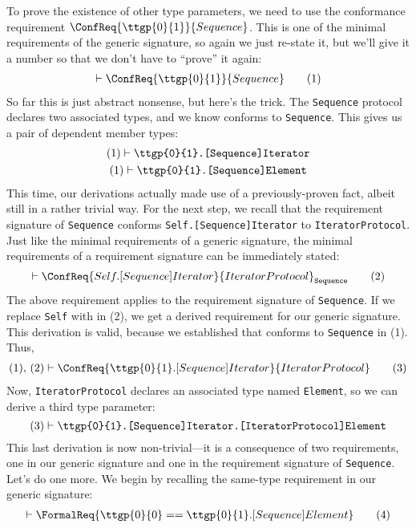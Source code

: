\documentclass[../generics]{subfiles}
\begin{document}
To prove the existence of other type parameters, we need to use the conformance requirement $\ConfReq{\ttgp{0}{1}}{Sequence}$. This is one of the minimal requirements of the generic signature, so again we just re-state it, but we'll give it a number so that we don't have to ``prove'' it again:
\begin{gather}
\vdash\ConfReq{\ttgp{0}{1}}{Sequence}\tag{1}
\end{gather}
So far this is just abstract nonsense, but here's the trick. The \texttt{Sequence} protocol declares two associated types, and we know  conforms to \texttt{Sequence}. This gives us a pair of dependent member types:
\begin{gather*}
(1)\vdash\texttt{\ttgp{0}{1}.[Sequence]Iterator}\\
(1)\vdash\texttt{\ttgp{0}{1}.[Sequence]Element}
\end{gather*}
This time, our derivations actually made use of a previously-proven fact, albeit still in a rather trivial way. For the next step, we recall that the requirement signature of \texttt{Sequence} conforms \texttt{Self.[Sequence]Iterator} to \texttt{IteratorProtocol}. Just like the minimal requirements of a generic signature, the minimal requirements of a requirement signature can be immediately stated:
\begin{gather}
\vdash\ConfReq{Self.[Sequence]Iterator}{IteratorProtocol}_\texttt{Sequence}\tag{2}
\end{gather}
The above requirement applies to the requirement signature of \texttt{Sequence}. If we replace \texttt{Self} with  in (2), we get a derived requirement for our generic signature. This derivation is valid, because we established that  conforms to \texttt{Sequence} in (1). Thus,
\begin{gather}
(1),\,(2)\vdash\ConfReq{\ttgp{0}{1}.[Sequence]Iterator}{IteratorProtocol}\tag{3}
\end{gather}
Now, \texttt{IteratorProtocol} declares an associated type named \texttt{Element}, so we can derive a third type parameter:
\[(3)\vdash\texttt{\ttgp{0}{1}.[Sequence]Iterator.[IteratorProtocol]Element}\]
This last derivation is now non-trivial---it is a consequence of two requirements, one in our generic signature and one in the requirement signature of \texttt{Sequence}. Let's do one more. We begin by recalling the same-type requirement in our generic signature:
\begin{gather}
\vdash\FormalReq{\ttgp{0}{0} == \ttgp{0}{1}.[Sequence]Element}\tag{4}
\end{gather}
\end{document}
